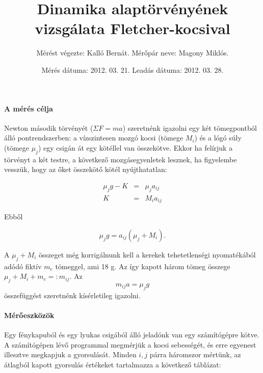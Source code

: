 \documentclass[10pt]{article}
\title{Dinamika alaptörvényének vizsgálata Fletcher-kocsival}
\author{Mérést végezte: Kalló Bernát. Mérőpár neve: Magony Miklós.}
\date{Mérés dátuma: 2012. 03. 21. Leadás dátuma: 2012. 03. 28.}
\begin{document}
\maketitle

\newcommand{\Mi}{\ensuremath{M_i}}
\newcommand{\muj}{\ensuremath{\mu_j}}
\newcommand{\aij}{\ensuremath{a_{ij}}}
\newcommand{\me}{\ensuremath{m_e}}
\newcommand{\mij}{\ensuremath{m_{ij}}}
\newcommand{\Fi}{\ensuremath{F_i}}

\paragraph*{A mérés célja} 
Newton második törvényét ($\Sigma F = m a$) szeretnénk igazolni egy két tömegpontból álló pontrendszerben: a vízszintesen mozgó kocsi (tömege \Mi) és a lógó súly (tömege \muj) egy csigán át egy kötéllel van összekötve. Ekkor ha felírjuk a törvényt a két testre, a következő mozgásegyenletek lesznek, ha figyelembe vesszük, hogy az őket összekötő kötél nyújthatatlan:

\[
\begin{array}{rcl}
\muj g - K & = & \muj \aij \\
             K & = & \Mi \aij
  \end{array}
\]

Ebből

\[ \muj g = \aij(\muj+\Mi). \]

A $\muj + \Mi$ összeget még korrigálnunk kell a kerekek tehetetlenségi nyomatékából adódó fiktív $\me$ tömeggel, ami 18 g. Az így kapott három tömeg összege $\muj + \Mi + \me =: \mij$.
Az \[ \mij a = \muj g \] összefüggést szeretnénk kísérletileg igazolni.



\paragraph*{Mérőeszközök} Egy fénykapuból és egy lyukas csigából álló jeladónk van egy számítógépre kötve. A számítógépen lévő programmal megmérjük a kocsi sebességét, és erre egyenest illesztve megkapjuk a gyorsulását. Minden $i,j$ párra háromszor mértünk, az átlagból kapott gyorsulás értékeket tartalmazza a következő táblázat:
\end{document}
